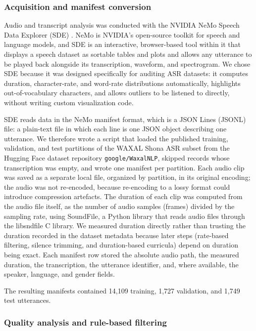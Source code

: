 \subsubsection{Acquisition and manifest conversion}
\label{sec:acquisition}

Audio and transcript analysis was conducted with the NVIDIA NeMo Speech Data
Explorer (SDE) \citep{Bakhturina2021}. NeMo is NVIDIA's open-source toolkit for
speech and language models, and SDE is an interactive, browser-based tool within
it that displays a speech dataset as sortable tables and plots and allows any
utterance to be played back alongside its transcription, waveform, and
spectrogram. We chose SDE because it was designed specifically for auditing ASR
datasets: it computes duration, character-rate, and word-rate distributions
automatically, highlights out-of-vocabulary characters, and allows outliers to be
listened to directly, without writing custom visualization code.

SDE reads data in the NeMo manifest format, which is a JSON Lines (JSONL) file:
a plain-text file in which each line is one JSON object describing one
utterance. We therefore wrote a script that loaded the published training,
validation, and test partitions of the WAXAL Shona ASR subset from the Hugging
Face dataset repository \texttt{google/WaxalNLP}, skipped records whose
transcription was empty, and wrote one manifest per partition. Each audio clip was
saved as a separate local file, organized by partition, in its original encoding;
the audio was not re-encoded, because re-encoding to a lossy format could
introduce compression artefacts. The duration of each clip was computed from the
audio file itself, as the number of audio samples (frames) divided by the
sampling rate, using SoundFile, a Python library that reads audio files through
the libsndfile C library. We measured duration directly rather than trusting the
duration recorded in the dataset metadata because later steps (rate-based
filtering, silence trimming, and duration-based curricula) depend on duration
being exact. Each manifest row stored the absolute audio path, the measured
duration, the transcription, the utterance identifier, and, where available, the
speaker, language, and gender fields.

The resulting manifests contained 14,109 training, 1,727 validation, and 1,749
test utterances.

\subsubsection{Quality analysis and rule-based filtering}
\label{sec:filtering}

